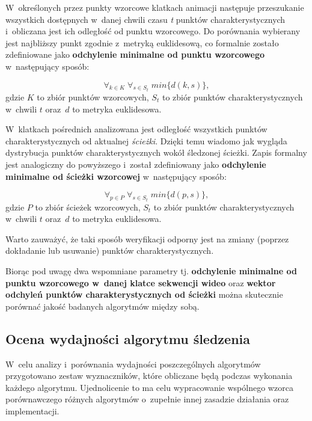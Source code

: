       W~określonych przez punkty wzorcowe klatkach animacji następuje przeszukanie wszystkich dostępnych w~danej chwili czasu \textit{t} punktów charakterystycznych i~obliczana jest ich odległość od punktu wzorcowego. Do porównania wybierany jest najbliższy punkt zgodnie z~metryką euklidesową, co formalnie zostało zdefiniowane jako \textbf{odchylenie minimalne od punktu wzorcowego} w~następujący sposób:

        \begin{equation}
          \forall_{k\in K} \; \forall_{s \in S_{t}} \; min\{ d(k, s) \},
        \end{equation}
      gdzie $K$ to zbiór punktów wzorcowych, $S_{t}$ to zbiór punktów charakterystycznych w~chwili $t$ oraz~$d$ to metryka euklidesowa.

      W~klatkach pośrednich analizowana jest odległość wszystkich punktów charakterystycznych od aktualnej \textit{ścieżki}. Dzięki temu wiadomo jak wygląda dystrybucja punktów charakterystycznych wokół śledzonej ścieżki. Zapis formalny jest analogiczny do powyższego i~został zdefiniowany jako \textbf{odchylenie minimalne od ścieżki wzorcowej} w~następujący sposób:

        \begin{equation}
          \forall_{p\in P} \; \forall_{s \in S_{t}} \; min\{ d(p, s) \},
        \end{equation}
      gdzie $P$ to zbiór ścieżek wzorcowych, $S_{t}$ to zbiór punktów charakterystycznych w~chwili $t$ oraz~$d$ to metryka euklidesowa.

      Warto zauważyć, że taki sposób weryfikacji odporny jest na zmiany (poprzez dokładanie lub usuwanie) punktów charakterystycznych.

      Biorąc pod uwagę dwa wspomniane parametry tj. \textbf{odchylenie minimalne od punktu wzorcowego w~danej klatce sekwencji wideo} oraz \textbf{wektor odchyleń punktów charakterystycznych od ścieżki} można skutecznie porównać jakość badanych algorytmów między sobą.

    \subsection{Ocena wydajności algorytmu śledzenia}\label{Subsection_Wydajnosc}

      W~celu analizy i~porównania wydajności poszczególnych algorytmów przygotowano zestaw wyznaczników, które obliczane będą podczas wykonania każdego algorytmu. Ujednolicenie to ma celu wypracowanie wspólnego wzorca porównawczego różnych algorytmów o~zupełnie innej zasadzie działania oraz implementacji.

